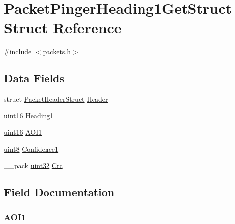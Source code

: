 \hypertarget{struct_packet_pinger_heading1_get_struct}{}\section{Packet\+Pinger\+Heading1\+Get\+Struct Struct Reference}
\label{struct_packet_pinger_heading1_get_struct}


{\ttfamily \#include $<$packets.\+h$>$}

\subsection*{Data Fields}
\begin{DoxyCompactItemize}
\item 
struct \hyperlink{struct_packet_header_struct}{Packet\+Header\+Struct} \hyperlink{struct_packet_pinger_heading1_get_struct_ab201af50281aff5ed4f984f994938007}{Header}
\item 
\hyperlink{_h_y_d_r_a_s_8_x_2types_8h_ac2a9e79eb120216f855626495b7bd18a}{uint16} \hyperlink{struct_packet_pinger_heading1_get_struct_aa69558470371823682e756cdede0619b}{Heading1}
\item 
\hyperlink{_h_y_d_r_a_s_8_x_2types_8h_ac2a9e79eb120216f855626495b7bd18a}{uint16} \hyperlink{struct_packet_pinger_heading1_get_struct_a7692b1635398931f2c1d9b3b45aea572}{A\+O\+I1}
\item 
\hyperlink{_h_y_d_r_a_s_8_x_2types_8h_a33a5e996e7a90acefb8b1c0bea47e365}{uint8} \hyperlink{struct_packet_pinger_heading1_get_struct_aa1ecb3c6ee2067686993dc4b6c60d44e}{Confidence1}
\item 
\+\_\+\+\_\+pack \hyperlink{_h_y_d_r_a_s_8_x_2types_8h_acbd4acd0d29e2d6c43104827f77d9cd2}{uint32} \hyperlink{struct_packet_pinger_heading1_get_struct_a9ac0191cb1217dfb4164ca0e333de3ac}{Crc}
\end{DoxyCompactItemize}


\subsection{Field Documentation}
\hypertarget{struct_packet_pinger_heading1_get_struct_a7692b1635398931f2c1d9b3b45aea572}{}
\subsubsection[{A\+O\+I1}]{ A\+O\+I1}\label{struct_packet_pinger_heading1_get_struct_a7692b1635398931f2c1d9b3b45aea572}
\hypertarget{struct_packet_pinger_heading1_get_struct_aa1ecb3c6ee2067686993dc4b6c60d44e}{}
